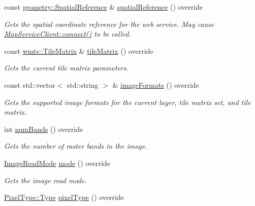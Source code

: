 \begin{DoxyCompactItemize}
const \hyperlink{classdg_1_1deepcore_1_1geometry_1_1_spatial_reference}{geometry\+::\+Spatial\+Reference} \& \hyperlink{classdg_1_1deepcore_1_1imagery_1_1_wmts_client_a9aa6eb184d4769e1c7b4242ecf4f3d8d}{spatial\+Reference} () override
\begin{DoxyCompactList}\small\item\em Gets the spatial coordinate reference for the web service. May cause \hyperlink{group___imagery_module_ga5e5f58c725cafba7966936f688a6ade0}{Map\+Service\+Client\+::connect()} to be called. \end{DoxyCompactList}\item 
const \hyperlink{structdg_1_1deepcore_1_1imagery_1_1wmts_1_1_tile_matrix}{wmts\+::\+Tile\+Matrix} \& \hyperlink{classdg_1_1deepcore_1_1imagery_1_1_wmts_client_a9d4a95bddb0537f61815b3d48a9363af}{tile\+Matrix} () override
\begin{DoxyCompactList}\small\item\em Gets the current tile matrix parameters. \end{DoxyCompactList}\item 
const std\+::vector$<$ std\+::string $>$ \& \hyperlink{classdg_1_1deepcore_1_1imagery_1_1_wmts_client_a89f67fe90aa2275e8a4ea34397e450a5}{image\+Formats} () override
\begin{DoxyCompactList}\small\item\em Gets the supported image formats for the current layer, tile matrix set, and tile matrix. \end{DoxyCompactList}\item 
int \hyperlink{classdg_1_1deepcore_1_1imagery_1_1_wmts_client_a2f01504ae2c8c65783e2878e1525fb65}{num\+Bands} () override
\begin{DoxyCompactList}\small\item\em Gets the number of raster bands in the image. \end{DoxyCompactList}\item 
\hyperlink{group___imagery_module_ga1db94ae833853b71ed501bb1ea8c1c24}{Image\+Read\+Mode} \hyperlink{classdg_1_1deepcore_1_1imagery_1_1_wmts_client_a011ce59444a970647066f9edf3a7544b}{mode} () override
\begin{DoxyCompactList}\small\item\em Gets the image read mode. \end{DoxyCompactList}\item 
\hyperlink{namespacedg_1_1deepcore_1_1imagery_1_1_pixel_type_a5f0c62edf4601cbd15e52b381697069d}{Pixel\+Type\+::\+Type} \hyperlink{classdg_1_1deepcore_1_1imagery_1_1_wmts_client_add4e49d815a0670abd0c0c59c8b698e7}{pixel\+Type} () override

\end{DoxyCompactItemize}
